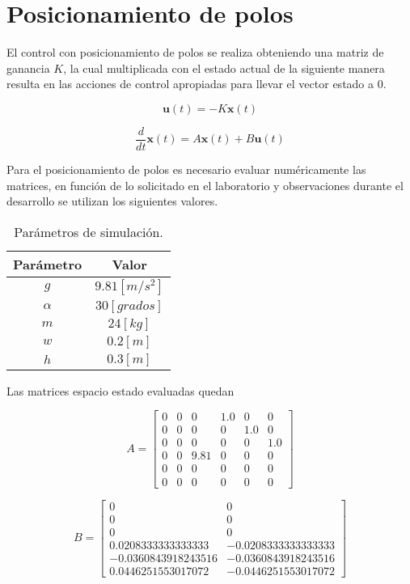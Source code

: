 \documentclass[titlepage, letterpaper]{article}
\begin{document}
\section{Posicionamiento de polos}

El control con posicionamiento de polos se realiza obteniendo una matriz de ganancia $K$, la cual multiplicada con el estado actual de la siguiente manera resulta en las acciones de control apropiadas para llevar el vector estado a 0.

\[\pmb{u}(t) = -K\pmb{x}(t)\]

\begin{equation*}
	\frac{d}{d t} \pmb{x}{\left(t \right)}
	= A\pmb{x}(t) + B \pmb{u}(t)
\end{equation*}

Para el posicionamiento de polos es necesario evaluar numéricamente las matrices, en función de lo solicitado en el laboratorio y observaciones durante el desarrollo se utilizan los siguientes valores.

\begin{table}[H]
	\centering
	\begin{tabular}{|c|c|}
	\hline
	Parámetro & Valor          \\ \hline
	$g$       & $9.81 [m/s^2]$ \\ \hline
	$\alpha$  & $30 [grados]$  \\ \hline
	$m$       & $24 [kg]$      \\ \hline
	$w$       & $0.2 [m]$     \\ \hline
	$h$       & $0.3 [m]$     \\ \hline
	\end{tabular}
	\caption{Parámetros de simulación.}
\end{table}

Las matrices espacio estado evaluadas quedan

\begin{equation*}
	A = \left[\begin{matrix}0 & 0 & 0 & 1.0 & 0 & 0\\0 & 0 & 0 & 0 & 1.0 & 0\\0 & 0 & 0 & 0 & 0 & 1.0\\0 & 0 & 9.81 & 0 & 0 & 0\\0 & 0 & 0 & 0 & 0 & 0\\0 & 0 & 0 & 0 & 0 & 0\end{matrix}\right]
\end{equation*}

\begin{equation*}
	B = \left[\begin{matrix}0 & 0\\0 & 0\\0 & 0\\0.0208333333333333 & -0.0208333333333333\\-0.0360843918243516 & -0.0360843918243516\\0.0446251553017072 & -0.0446251553017072\end{matrix}\right]
\end{equation*}
\end{document}
